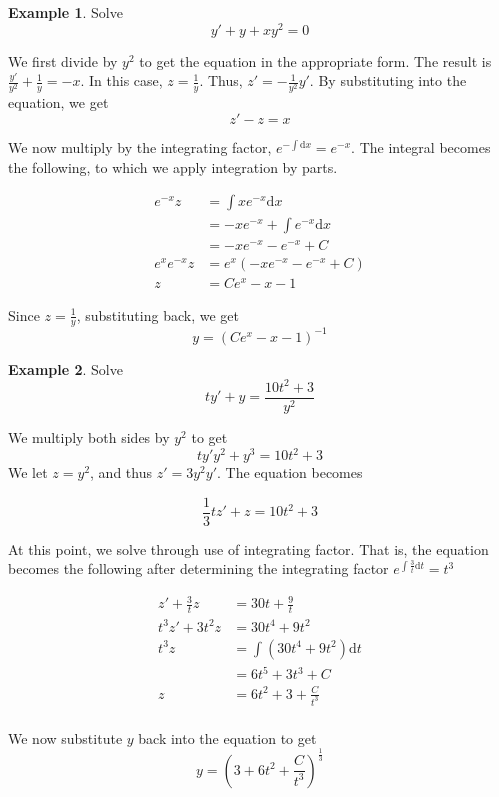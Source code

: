 \documentclass[11pt]{article}
\theoremstyle{plain} %
\theoremstyle{definition}
\theoremstyle{example}
\newtheorem*{example}{Example}
\theoremstyle{remark}
\begin{document}
\begin{example}
Solve $$y' + y + xy^2 = 0$$
\end{example}

We first divide by $y^2$ to get the equation in the appropriate form. The result is $\frac{y'}{y^2}+ \frac{1}{y} = -x$. In this case, $z = \frac{1}{y}$. Thus, $z' = -\frac{1}{y^2}y'$. By substituting into the equation, we get $$z' - z = x$$

We now multiply by the integrating factor, $e^{-\int \mathrm d x} = e^{-x}$. The integral becomes the following, to which we apply integration by parts. 

\begin{align*}
e^{-x}z &= \int xe^{-x}\mathrm d x \\
&= -xe^{-x}+\int e^{-x} \mathrm d x\\
&= -xe^{-x}-e^{-x} + C\\
e^xe^{-x}z &= e^x\left(-xe^{-x}-e^{-x} + C\right)\\
z &= Ce^x-x-1
\end{align*}

Since $z = \frac{1}{y}$, substituting back, we get $$y = \left(Ce^x -x-1\right)^{-1}$$

\begin{example}
Solve $$ty' + y = \frac{10t^2+3}{y^2}$$
\end{example}

We multiply both sides by $y^2$ to get $$ty'y^2 + y^3 = 10t^2+3$$ We let $z=y^2$, and thus $z' = 3y^2y'$. The equation becomes

$$\frac{1}{3}tz' + z = 10t^2 + 3$$

At this point, we solve through use of integrating factor. That is, the equation becomes the following after determining the integrating factor $e^{\int \frac{3}{t} \mathrm d t} = t^3$

\begin{align*}
z' + \frac{3}{t}z &= 30t + \frac{9}{t} \\
t^3z' + 3t^2z &= 30t^4 + 9t^2\\
t^3z &= \int\left(30t^4 + 9t^2\right)\mathrm d t\\
&= 6t^5+3t^3+C\\
z &= 6t^2 + 3 + \frac{C}{t^3}\\
\end{align*}

We now substitute $y$ back into the equation to get $$y = \left(3 + 6t^2 + \frac{C}{t^3}\right)^{\frac{1}{3}}$$
\end{document}
